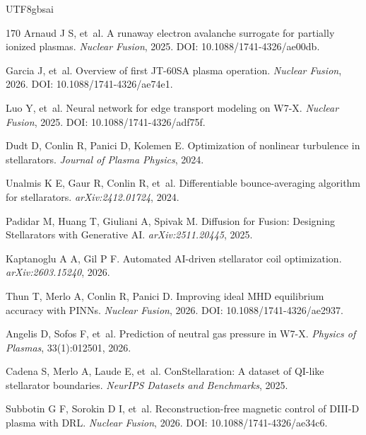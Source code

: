 \documentclass[12pt,a4paper]{article}
\begin{document}
\begin{CJK}{UTF8}{gbsai}
\begin{thebibliography}{170}
Arnaud J S, et~al.
\newblock A runaway electron avalanche surrogate for partially ionized plasmas.
\newblock \textit{Nuclear Fusion}, 2025. DOI: 10.1088/1741-4326/ae00db.

Garcia J, et~al.
\newblock Overview of first JT-60SA plasma operation.
\newblock \textit{Nuclear Fusion}, 2026. DOI: 10.1088/1741-4326/ae74e1.

Luo Y, et~al.
\newblock Neural network for edge transport modeling on W7-X.
\newblock \textit{Nuclear Fusion}, 2025. DOI: 10.1088/1741-4326/adf75f.

Dudt D, Conlin R, Panici D, Kolemen E.
\newblock Optimization of nonlinear turbulence in stellarators.
\newblock \textit{Journal of Plasma Physics}, 2024.

Unalmis K E, Gaur R, Conlin R, et~al.
\newblock Differentiable bounce-averaging algorithm for stellarators.
\newblock \textit{arXiv:2412.01724}, 2024.

Padidar M, Huang T, Giuliani A, Spivak M.
\newblock Diffusion for Fusion: Designing Stellarators with Generative AI.
\newblock \textit{arXiv:2511.20445}, 2025.

Kaptanoglu A A, Gil P F.
\newblock Automated AI-driven stellarator coil optimization.
\newblock \textit{arXiv:2603.15240}, 2026.

Thun T, Merlo A, Conlin R, Panici D.
\newblock Improving ideal MHD equilibrium accuracy with PINNs.
\newblock \textit{Nuclear Fusion}, 2026. DOI: 10.1088/1741-4326/ae2937.

Angelis D, Sofos F, et~al.
\newblock Prediction of neutral gas pressure in W7-X.
\newblock \textit{Physics of Plasmas}, 33(1):012501, 2026.

Cadena S, Merlo A, Laude E, et~al.
\newblock ConStellaration: A dataset of QI-like stellarator boundaries.
\newblock \textit{NeurIPS Datasets and Benchmarks}, 2025.

Subbotin G F, Sorokin D I, et~al.
\newblock Reconstruction-free magnetic control of DIII-D plasma with DRL.
\newblock \textit{Nuclear Fusion}, 2026. DOI: 10.1088/1741-4326/ae34c6.


\end{thebibliography}
\end{CJK}
\end{document}
